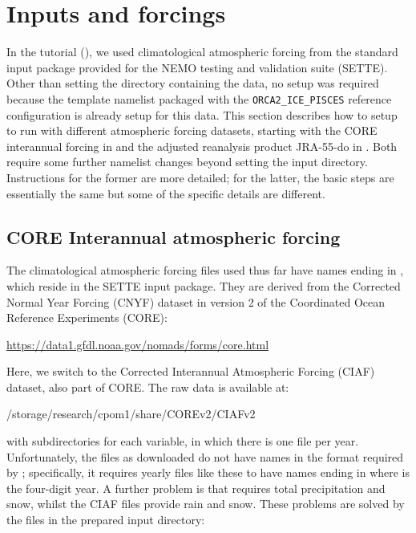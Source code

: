 \clearpage
\section{Inputs and forcings}
\label{sec:inputs}

In the tutorial (), we used climatological atmospheric forcing from the standard input package  provided for the NEMO testing and validation suite (SETTE).
Other than setting the directory containing the data, no setup was required because the template namelist packaged with the \mbox{\texttt{ORCA2_ICE_PISCES}} reference configuration is already setup for this data.
This section describes how to setup \NEMOSIcu{} to run with different atmospheric forcing datasets, starting with the CORE interannual forcing in  and the adjusted reanalysis product \mbox{JRA-55-do} in .
Both require some further namelist changes beyond setting the input directory.
Instructions for the former are more detailed; for the latter, the basic steps are essentially the same but some of the specific details are different.


\subsection{CORE Interannual atmospheric forcing}
\label{sec:inputs-core-ciaf}

The climatological atmospheric forcing files used thus far have names ending in , which reside in the SETTE input package.
They are derived from the Corrected Normal Year Forcing (CNYF) dataset in version 2 of the Coordinated Ocean Reference Experiments (CORE):

\begin{center}
    \url{https://data1.gfdl.noaa.gov/nomads/forms/core.html}
\end{center}

Here, we switch to the Corrected Interannual Atmospheric Forcing (CIAF) dataset, also part of CORE.
The raw data is available at:

\begin{VerbatimFile}
/storage/research/cpom1/share/COREv2/CIAFv2
\end{VerbatimFile}

with subdirectories for each variable, in which there is one file per year.
Unfortunately, the files as downloaded do not have names in the format required by \NEMOSIcu{}; specifically, it requires yearly files like these to have names ending in  where  is the four-digit year.
A further problem is that \NEMOSIcu{} requires total precipitation and snow, whilst the CIAF files provide rain and snow.
These problems are solved by the files in the prepared input directory:

